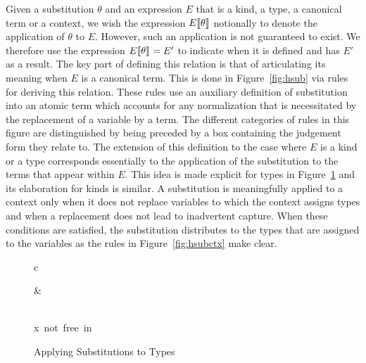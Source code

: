 Given a substitution $\theta$ and an expression $E$ that is a kind, a
type, a canonical term or a context, we wish the expression
$E\llbracket {\theta} \rrbracket$ notionally to denote the application of $\theta$
to $E$.
%
However, such an application is not guaranteed to exist.
%
We therefore use the expression $E\llbracket {\theta} \rrbracket_{} = E'$ to indicate
when it is defined and has $E'$ as a result.
%
The key part of defining this relation is that of articulating
its meaning when $E$ is a canonical term.
%
This is done in Figure~\ref{fig:hsub} via rules for deriving this
relation. 
%
These rules use an auxiliary definition of substitution into an
atomic term which accounts for any normalization that is necessitated
by the replacement of a variable by a term.
%
The different categories of rules in this figure are distinguished by
being preceded by a box containing the judgement form they relate to.
%
The extension of this definition to the case where $E$ is a kind or a type
corresponds essentially to the application of the substitution to the
terms that appear within $E$. 
%
This idea is made explicit for types in Figure~\ref{fig:hsubtypes} and its
elaboration for kinds is similar.
%
A substitution is meaningfully applied to a context only when it does
not replace variables to which the context assigns types and when a
replacement does not lead to inadvertent capture.
%
When these conditions are satisfied, the substitution distributes to
the types that are assigned to the variables as the rules in
Figure~\ref{fig:hsubctx} make clear. 


\begin{figure}[tbhp]
\begin{center}
\begin{tabular}{c}
      { }

\qquad \qquad
  
      { &
       }

\\[10pt]

      {x\ \mbox{\rm not free in}\ \domain{\theta} \cup \range{\theta}
        \qquad
         \qquad
       }
\end{tabular}
\end{center}

\caption{Applying Substitutions to Types}
\label{fig:hsubtypes}
\end{figure}

